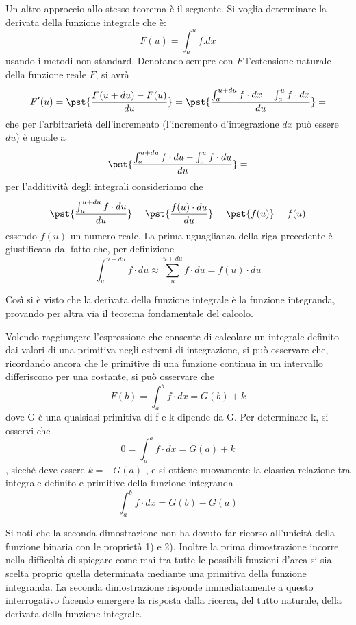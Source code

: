 Un altro approccio allo stesso teorema è il seguente.
Si voglia determinare la derivata della funzione integrale che è: 
\[F(u) = \int_a^u f.dx\]
usando i metodi non standard. Denotando sempre con \(F\) l'estensione 
naturale della funzione reale \(F\), si avrà
\[F'(u) = \pst{\frac{F(u+du)-F(u)}{du}} = 
\pst{\frac{\int_a^{u+du} f\cdot dx - \int_a^u f\cdot dx}{du}} =\] 
che per l'arbitrarietà dell'incremento (l'incremento d'integrazione \(dx\) 
può essere \(du\)) è uguale a
\[\pst{\frac{\int_a^{u+du} f\cdot du - \int_a^u f\cdot du}{du}} =\]
per l'additività degli integrali consideriamo che
\[\pst{\frac{\int_u^{u+du} f \cdot du}{du}} = 
    \pst{\frac{f(u) \cdot du}{du}} = \pst{f(u)} = f(u)\]
essendo \(f(u)\) un numero reale. La prima uguaglianza della riga
precedente è giustificata dal fatto che, per definizione 
\[\int_u^{u+du} f \cdot du \approx \sum_u^{u+du} f \cdot du = 
  f(u) \cdot du\]

 Così si è visto che la derivata della funzione integrale è la funzione 
integranda, provando per altra via il teorema fondamentale del calcolo.

Volendo raggiungere l'espressione che consente di calcolare un integrale 
definito dai valori di una primitiva negli estremi di integrazione, si può 
osservare che, ricordando ancora che le primitive di una funzione continua in 
un intervallo differiscono per una costante, si può osservare che
\[F(b) = \int_a^b f\cdot dx = G(b) + k\]
dove G è una qualsiasi primitiva di f e k dipende da G. Per determinare k, si 
osservi che
\[0 = \int_a^a f\cdot dx = G(a) + k\],
sicché deve essere \(k = - G(a)\) , e si ottiene nuovamente la classica 
relazione 
tra integrale definito e primitive della funzione integranda 
\[\int_a^b f \cdot dx = G(b) - G(a)\]

 Si noti che la seconda dimostrazione non ha dovuto far ricorso all'unicità 
della funzione binaria con le proprietà 1) e 2). Inoltre la prima 
dimostrazione incorre nella difficoltà di spiegare come mai tra tutte le 
possibili funzioni d'area si sia scelta proprio quella determinata mediante 
una primitiva della funzione integranda. La seconda dimostrazione risponde 
immediatamente a questo interrogativo facendo emergere la risposta dalla 
ricerca, del tutto naturale, della derivata della funzione integrale.

